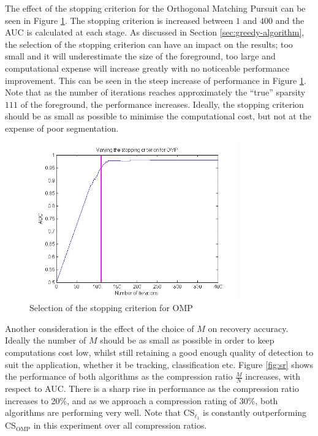 The effect of the stopping criterion for the Orthogonal Matching Pursuit can be seen in Figure \ref{fig:omp}. The stopping criterion is increased between $1$ and $400$ and the AUC is calculated at each stage. As discussed in Section \ref{sec:greedy-algorithm}, the selection of the stopping criterion can have an impact on the results; too small and it will underestimate the size of the foreground, too large and computational expense will increase greatly with no noticeable performance improvement. This can be seen in the steep increase of performance in Figure \ref{fig:omp}. Note that as the number of iterations reaches approximately the ``true'' sparsity $111$ of the foreground, the performance increases. Ideally, the stopping criterion should be as small as possible to minimise the computational cost, but not at the expense of poor segmentation. 

\begin{figure}[t]
  \centering
  \includegraphics[width = 9cm]{varyingSComp}
  \caption{Selection of the stopping criterion for OMP}
  \label{fig:omp}
\end{figure}

Another consideration is the effect of the choice of $M$ on recovery accuracy. Ideally the number of $M$ should be as small as possible in order to keep computations cost low, whilst still retaining a good enough quality of detection to suit the application, whether it be tracking, classification etc. Figure \ref{fig:sr} shows the performance of both algorithms as the compression ratio $\frac{M}{N}$ increases, with respect to AUC. There is a sharp rise in performance as the compression ratio increases to 20\%, and as we approach a compression rating of 30\%, both algorithms are performing very well. Note that CS$_{\ell_1}$ is constantly outperforming CS$_{\text{OMP}}$ in this experiment over all compression ratios.

